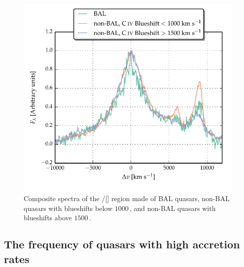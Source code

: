 \begin{figure}
    \centering
    \includegraphics[width=0.8\linewidth]{figures/chapter03/bal_composite.pdf}
    \caption[{Composite spectra of the \hbns/[] region for BAL and non-BAL quasars.}]{Composite spectra of the \hbns/[] region made of BAL quasars, non-BAL quasars with  blueshifts below $1000$\,\kms, and non-BAL quasars with  blueshifts above $1500$\,\kms. }
    \label{fig:bal_composite}
\end{figure}

\subsection{The frequency of quasars with high accretion rates}

